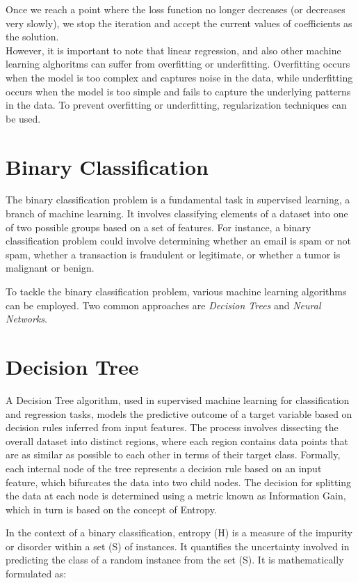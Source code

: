 Once we reach a point where the loss function no longer decreases (or decreases very slowly), we stop the iteration and accept the current values of coefficients as the solution.
\\

However, it is important to note that linear regression, and also other machine learning alghoritms can suffer from overfitting or underfitting. Overfitting occurs when the model is too complex and captures noise in the data, while underfitting occurs when the model is too simple and fails to capture the underlying patterns in the data. To prevent overfitting or underfitting, regularization techniques can be used.

\newpage

\section{Binary Classification}
The binary classification problem is a fundamental task in supervised learning, a branch of machine learning. It involves classifying elements of a dataset into one of two possible groups based on a set of features. For instance, a binary classification problem could involve determining whether an email is spam or not spam, whether a transaction is fraudulent or legitimate, or whether a tumor is malignant or benign.

To tackle the binary classification problem, various machine learning algorithms can be employed. Two common approaches are \textit{Decision Trees} and \textit{Neural Networks}. 

\section{Decision Tree}
A Decision Tree algorithm, used in supervised machine learning for classification and regression tasks, models the predictive outcome of a target variable based on decision rules inferred from input features. The process involves dissecting the overall dataset into distinct regions, where each region contains data points that are as similar as possible to each other in terms of their target class. Formally, each internal node of the tree represents a decision rule based on an input feature, which bifurcates the data into two child nodes. The decision for splitting the data at each node is determined using a metric known as Information Gain, which in turn is based on the concept of Entropy.

In the context of a binary classification, entropy (H) is a measure of the impurity or disorder within a set (S) of instances. It quantifies the uncertainty involved in predicting the class of a random instance from the set (S). It is mathematically formulated as:

